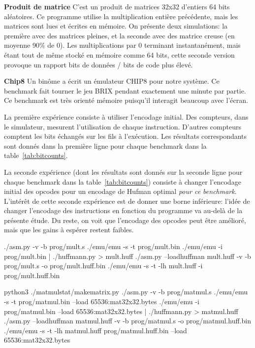 \documentclass[architecture]{compas2018}
\newcommand{\todo}[1]{\textcolor{red}{TODO: #1}}
\begin{document}
\textbf{Produit de matrice}
C'est un produit de matrices 32x32 d'entiers 64 bits aléatoires.
Ce programme utilise la multiplication entière précédente, mais les matrices sont lues et écrites en mémoire.
On présente deux simulations: la première avec des matrices pleines, et la seconde avec des matrice creuse (en moyenne 90\% de 0).
Les multiplications par 0 terminant instantanément, mais étant tout de même stocké en mémoire comme 64 bits, cette seconde version provoque un rapport bits de données / bits de code plus élevé.

\textbf{Chip8}
Un binôme a écrit un émulateur CHIP8 \cite{Chip8:1978} pour notre système.
Ce benchmark fait tourner le jeu BRIX pendant exactement une minute par partie.
Ce benchmark est très orienté mémoire puisqu'il interagit beaucoup avec l'écran.

La première expérience consiste à utiliser l'encodage initial.
Des compteurs, dans le simulateur, mesurent l'utilisation de chaque instruction.%
D'autres compteurs comptent les bits échangés sur les fils à l'exécution.
Les résultats correspondants sont donnés dans la première  ligne pour chaque benchmark dans la table~\ref{tab:bitcounts}.

La seconde expérience (dont les résultats sont donnés sur la seconde ligne pour chaque benchmark dans la table~\ref{tab:bitcounts}) consiste à changer l'encodage initial des opcodes pour un encodage de Hufman optimal \emph{pour ce benchmark}.
L'intérêt de cette seconde expérience est de donner une borne inférieure: l'idée de changer l'encodage des instructions en fonction du programme va au-delà de la présente étude.
Du reste, on voit que l'encodage des opcodes peut être amélioré, mais que les gains à espérer restent faibles.


\iffalse
./asm.py -v -b prog/mult.s
./emu/emu -s -t prog/mult.bin
./emu/emu -i prog/mult.bin | ./huffmann.py > mult.huff
./asm.py --loadhuffman mult.huff -v -b prog/mult.s -o  prog/mult.huff.bin
./emu/emu -s -t -lh mult.huff -i prog/mult.huff.bin

python3 ./matmulstat/makematrix.py
./asm.py -v -b prog/matmul.s
./emu/emu -s -t prog/matmul.bin --load 65536:mat32x32.bytes
./emu/emu -i prog/matmul.bin --load 65536:mat32x32.bytes | ./huffmann.py > matmul.huff
./asm.py --loadhuffman matmul.huff -v -b prog/matmul.s -o prog/matmul.huff.bin
./emu/emu -s -t -lh matmul.huff prog/matmul.huff.bin --load 65536:mat32x32.bytes
\end{document}
